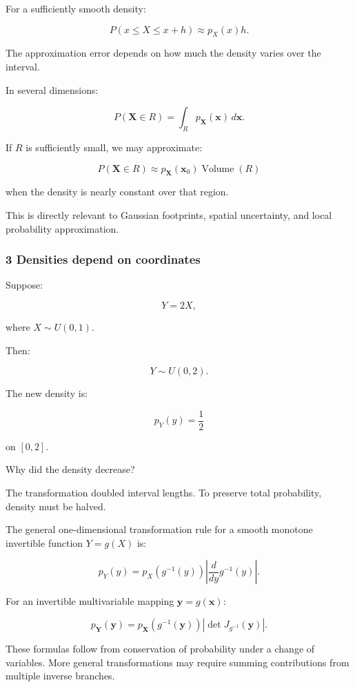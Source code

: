For a sufficiently smooth density:

\[
 P(x\le X\le x+h) \approx p_X(x)h.
\]

The approximation error depends on how much the density varies over the interval.

In several dimensions:

\[
 P(\mathbf X\in R) = \int_Rp_{\mathbf X}(\mathbf x)\,d\mathbf x.
\]

If \(R\) is sufficiently small, we may approximate:

\[
 P(\mathbf X\in R) \approx p_{\mathbf X}(\mathbf x_0)\operatorname{Volume}(R)
\]

when the density is nearly constant over that region.

This is directly relevant to Gaussian footprints, spatial uncertainty, and local probability approximation.

\subsubsection{3 Densities depend on coordinates}\label{02-foundations-ii-ch023-densities-depend-on-coordinates}

\hypertarget{02-foundations-ii-ch023-densities-depend-on-coordinates}{}

Suppose:

\[
 Y=2X,
\]

where \(X\sim U(0,1)\).

Then:

\[
 Y\sim U(0,2).
\]

The new density is:

\[
 p_Y(y)=\frac12
\]

on \([0,2]\).

Why did the density decrease?

The transformation doubled interval lengths. To preserve total probability, density must be halved.

The general one-dimensional transformation rule for a smooth monotone invertible function \(Y=g(X)\) is:

\[
 \boxed{ p_Y(y) = p_X(g^{-1}(y)) \left| \frac{d}{dy}g^{-1}(y) \right| }.
\]

For an invertible multivariable mapping \(\mathbf y=g(\mathbf x)\):

\[
 \boxed{ p_{\mathbf Y}(\mathbf y) = p_{\mathbf X}(g^{-1}(\mathbf y)) \left| \det J_{g^{-1}}(\mathbf y) \right| }.
\]

These formulas follow from conservation of probability under a change of variables. More general transformations may require summing contributions from multiple inverse branches.

